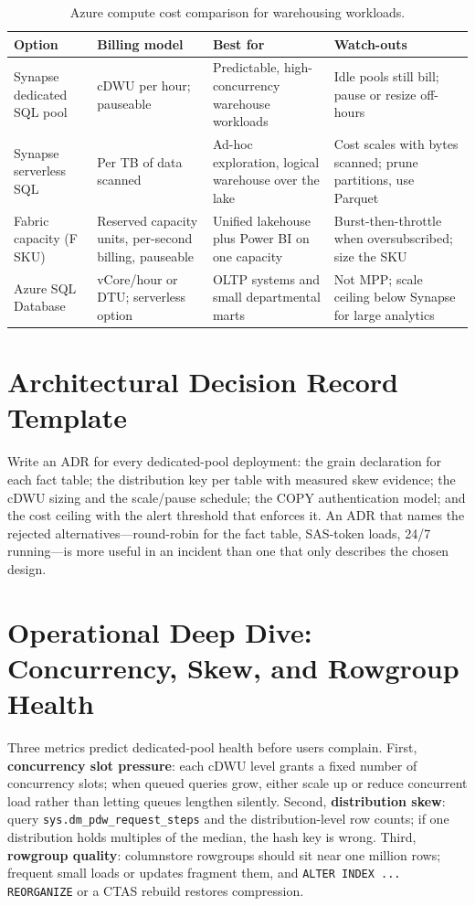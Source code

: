 \begin{table}[H]
\centering
\small
\begin{tabular}{@{}p{3.2cm}p{3.1cm}p{3.5cm}p{3.8cm}@{}}
\toprule
\textbf{Option} & \textbf{Billing model} & \textbf{Best for} & \textbf{Watch-outs} \\
\midrule
Synapse dedicated SQL pool & cDWU per hour; pauseable & Predictable, high-concurrency warehouse workloads & Idle pools still bill; pause or resize off-hours \\
Synapse serverless SQL & Per TB of data scanned & Ad-hoc exploration, logical warehouse over the lake & Cost scales with bytes scanned; prune partitions, use Parquet \\
Fabric capacity (F SKU) & Reserved capacity units, per-second billing, pauseable & Unified lakehouse plus Power BI on one capacity & Burst-then-throttle when oversubscribed; size the SKU \\
Azure SQL Database & vCore/hour or DTU; serverless option & OLTP systems and small departmental marts & Not MPP; scale ceiling below Synapse for large analytics \\
\bottomrule
\end{tabular}
\caption{Azure compute cost comparison for warehousing workloads.}
\label{tab:ch5-cost-comparison}
\end{table}

\section{Architectural Decision Record Template}
Write an ADR for every dedicated-pool deployment: the grain declaration for each fact table; the distribution key per table with measured skew evidence; the cDWU sizing and the scale/pause schedule; the COPY authentication model; and the cost ceiling with the alert threshold that enforces it. An ADR that names the rejected alternatives---round-robin for the fact table, SAS-token loads, 24/7 running---is more useful in an incident than one that only describes the chosen design.

\section{Operational Deep Dive: Concurrency, Skew, and Rowgroup Health}
Three metrics predict dedicated-pool health before users complain. First, \textbf{concurrency slot pressure}: each cDWU level grants a fixed number of concurrency slots; when queued queries grow, either scale up or reduce concurrent load rather than letting queues lengthen silently. Second, \textbf{distribution skew}: query \texttt{sys.dm\_pdw\_request\_steps} and the distribution-level row counts; if one distribution holds multiples of the median, the hash key is wrong. Third, \textbf{rowgroup quality}: columnstore rowgroups should sit near one million rows; frequent small loads or updates fragment them, and \texttt{ALTER INDEX ... REORGANIZE} or a CTAS rebuild restores compression.

